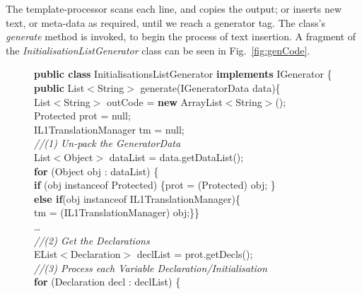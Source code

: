 \documentclass{llncs}%
\begin{document}
%
The template-processor scans each line, and copies the output; or inserts new text, or meta-data as required, until we reach a generator tag. The class's \emph{generate} method is invoked, to begin the process of text insertion. A fragment of the \emph{InitialisationListGenerator} class can be seen in Fig.~\ref{fig:genCode}. 
%
%
\begin{figure}
\centering
\begin{minipage}{0.85\textwidth}
\textbf{public class} InitialisationsListGenerator \textbf{implements} IGenerator \{\\
\hspace*{0.2cm}\textbf{public} List$<$String$>$ generate(IGeneratorData data)\{\\
\hspace*{0.4cm}List$<$String$>$ outCode = \textbf{new} ArrayList$<$String$>$();\\
\hspace*{0.4cm}Protected prot = null;\\
\hspace*{0.4cm}IL1TranslationManager tm = null;\\
\hspace*{0.4cm}\emph{//(1) Un-pack the GeneratorData}\\
\hspace*{0.4cm}List$<$Object$>$ dataList = data.getDataList();\\
\hspace*{0.4cm}\textbf{for} (Object obj : dataList) \{\\
\hspace*{0.6cm}\textbf{if} (obj instanceof Protected) \{prot = (Protected) obj;	\}\\
\hspace*{0.6cm}\textbf{else if}(obj instanceof IL1TranslationManager)\{\\
\hspace*{0.8cm}tm = (IL1TranslationManager) obj;\}\}\\
\hspace*{0.2cm}\ldots\\
\hspace*{0.2cm}\emph{//(2) Get the Declarations}\\
\hspace*{0.2cm}EList$<$Declaration$>$ declList = prot.getDecls();\\
\hspace*{0.2cm}\emph{//(3) Process each Variable Declaration/Initialisation}\\
\hspace*{0.2cm}\textbf{for} (Declaration decl : declList) \{\\

\end{minipage}
\end{figure}
\end{document}
